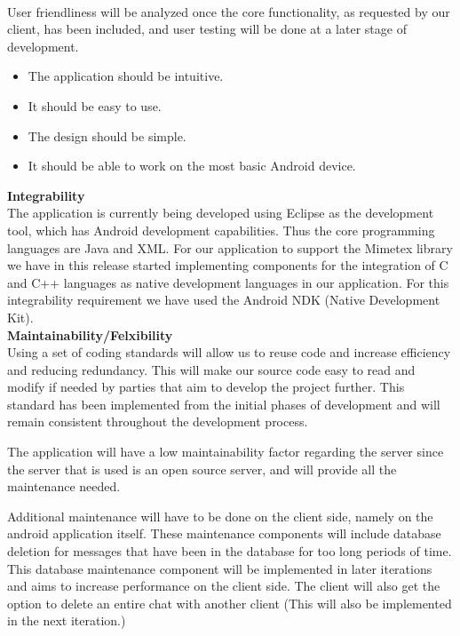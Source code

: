 \documentclass[29pt,a4paper]{moderncv}
\begin{document}
				\\User friendliness will be analyzed once the core functionality, as requested by our client, has been included, and user testing will be done at a later stage of development.
				\begin{itemize}
					\item The application should be intuitive.
					\item It should be easy to use.
					\item The design should be simple.
					\item It should be able to work on the most basic Android device.\\
				\end{itemize}
				
			\noindent\textbf{Integrability}\\
				The application is currently being developed using Eclipse as the development tool, which has Android development capabilities.  Thus the core programming languages are Java and XML.  For our application to support the Mimetex library we have in this release started implementing components for the integration of C and C++ languages as native development languages in our application.  For this integrability requirement we have used the Android NDK (Native Development Kit).
				\\
							
			\noindent\textbf{Maintainability/Felxibility}
				\\Using a set of coding standards will allow us to reuse code and increase efficiency and reducing redundancy. This will make our source code easy to read and modify if needed by parties that aim to develop the project further.  This standard has been implemented from the initial phases of development and will remain consistent throughout the development process.
				
				The application will have a low maintainability factor regarding the server since the server that is used is an open source server, and will provide all the maintenance needed.
				
				Additional maintenance will have to be done on the client side, namely on the android application itself.  These maintenance components will include database deletion for messages that have been in the database for too long periods of time.  This database maintenance component will be implemented in later iterations and aims to increase performance on the client side. 
				The client will also get the option to delete an entire chat with another client (This will also be implemented in the next iteration.)
				
\end{document}
